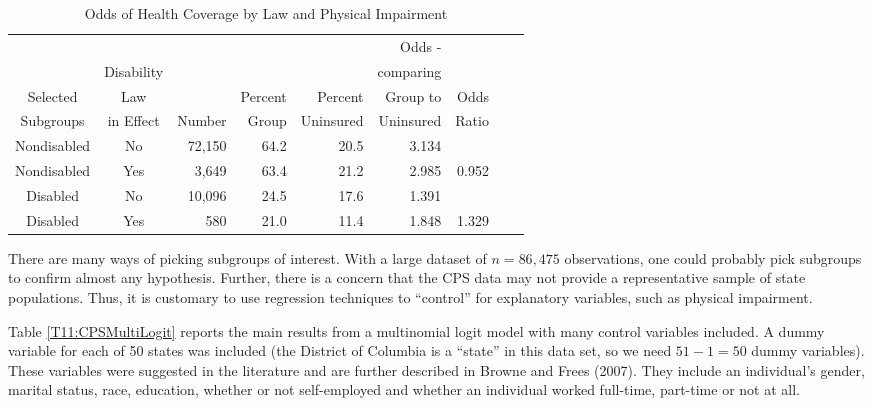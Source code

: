   \begin{center}  \begin{table}[h]
\caption{\label{T11:CPSDisSumStats} Odds of Health Coverage by Law
and Physical Impairment}
\begin{tabular}{ccrrrrrrr}
\hline
         &                &      &         &          &     Odds -    & \\
         & Disability     &      &         &          &    comparing & \\
Selected & Law            &      & Percent &Percent   &  Group to    & Odds \\
Subgroups& in Effect      &Number& Group   &Uninsured & Uninsured    & Ratio \\
\hline
Nondisabled & No & 72,150 & 64.2 & 20.5 & 3.134 & \\
Nondisabled & Yes & 3,649 & 63.4 & 21.2 & 2.985 & 0.952 \\
Disabled & No & 10,096 & 24.5 & 17.6 & 1.391 & \\
Disabled & Yes & 580 & 21.0 & 11.4 & 1.848 & 1.329  \\
\hline
\end{tabular}
\end{table}  \end{center}  

\bigskip

There are many ways of picking subgroups  of interest. With a large
dataset of $n=86,475$ observations, one could probably pick
subgroups to confirm almost any hypothesis. Further, there is a
concern that the CPS data may not provide a representative sample of
state populations. Thus, it is customary to use regression
techniques to ``control'' for explanatory variables, such as
physical impairment.

Table \ref{T11:CPSMultiLogit} reports the main results from a
multinomial logit model with many control variables included. A
dummy variable for each of 50 states was included (the District of
Columbia is a ``state'' in this data set, so we need $51-1=50$ dummy
variables). These variables were suggested in the literature and are
further described in Browne and Frees (2007). They include an
individual's gender, marital status, race, education, whether or not
self-employed and whether an individual worked full-time, part-time
or not at all.

